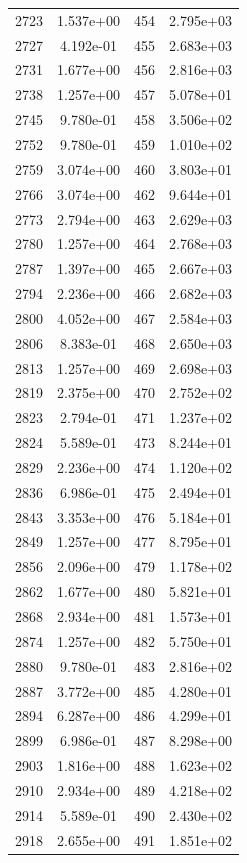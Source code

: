 \documentclass[12pt]{article}
\begin{document}
\begin{longtable}{@{}cccc@{}}
2723 & 1.537e+00 & 454 & 2.795e+03 \\
2727 & 4.192e-01 & 455 & 2.683e+03 \\
2731 & 1.677e+00 & 456 & 2.816e+03 \\
2738 & 1.257e+00 & 457 & 5.078e+01 \\
2745 & 9.780e-01 & 458 & 3.506e+02 \\
2752 & 9.780e-01 & 459 & 1.010e+02 \\
2759 & 3.074e+00 & 460 & 3.803e+01 \\
2766 & 3.074e+00 & 462 & 9.644e+01 \\
2773 & 2.794e+00 & 463 & 2.629e+03 \\
2780 & 1.257e+00 & 464 & 2.768e+03 \\
2787 & 1.397e+00 & 465 & 2.667e+03 \\
2794 & 2.236e+00 & 466 & 2.682e+03 \\
2800 & 4.052e+00 & 467 & 2.584e+03 \\
2806 & 8.383e-01 & 468 & 2.650e+03 \\
2813 & 1.257e+00 & 469 & 2.698e+03 \\
2819 & 2.375e+00 & 470 & 2.752e+02 \\
2823 & 2.794e-01 & 471 & 1.237e+02 \\
2824 & 5.589e-01 & 473 & 8.244e+01 \\
2829 & 2.236e+00 & 474 & 1.120e+02 \\
2836 & 6.986e-01 & 475 & 2.494e+01 \\
2843 & 3.353e+00 & 476 & 5.184e+01 \\
2849 & 1.257e+00 & 477 & 8.795e+01 \\
2856 & 2.096e+00 & 479 & 1.178e+02 \\
2862 & 1.677e+00 & 480 & 5.821e+01 \\
2868 & 2.934e+00 & 481 & 1.573e+01 \\
2874 & 1.257e+00 & 482 & 5.750e+01 \\
2880 & 9.780e-01 & 483 & 2.816e+02 \\
2887 & 3.772e+00 & 485 & 4.280e+01 \\
2894 & 6.287e+00 & 486 & 4.299e+01 \\
2899 & 6.986e-01 & 487 & 8.298e+00 \\
2903 & 1.816e+00 & 488 & 1.623e+02 \\
2910 & 2.934e+00 & 489 & 4.218e+02 \\
2914 & 5.589e-01 & 490 & 2.430e+02 \\
2918 & 2.655e+00 & 491 & 1.851e+02 \\

\end{longtable}
\end{document}
